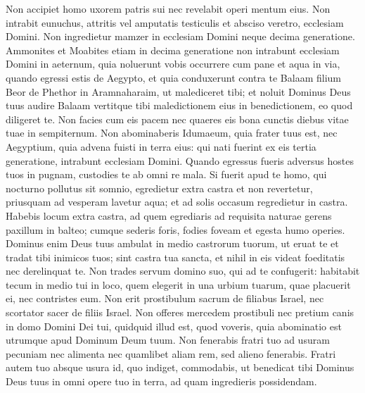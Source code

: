 \begin{biblechapter}
\begin{biblechapter}
\begin{biblechapter}
\begin{biblechapter}
\begin{biblechapter}
\begin{biblechapter}
\begin{biblechapter}
\begin{biblechapter}
\begin{biblechapter}
\begin{biblechapter}
\begin{biblechapter}
\begin{biblechapter}
\begin{biblechapter}
\begin{biblechapter}
\begin{biblechapter}
\begin{biblechapter}
\begin{biblechapter}
\begin{biblechapter}
\begin{biblechapter}
\begin{biblechapter}
\begin{biblechapter}
\begin{biblechapter}
\begin{biblechapter}
\verse Non accipiet homo uxorem patris sui nec revelabit operi mentum eius.
 \verse Non intrabit eunuchus, attritis vel amputatis testiculis et absciso veretro, ecclesiam Domini. 
\verse Non ingredietur mamzer in ecclesiam Domini neque decima generatione. 
\verse Ammonites et Moabites etiam in decima generatione non intrabunt ecclesiam Domini in aeternum, 
\verse quia noluerunt vobis occurrere cum pane et aqua in via, quando egressi estis de Aegypto, et quia conduxerunt contra te Balaam filium Beor de Phethor in Aramnaharaim, ut malediceret tibi; 
\verse et noluit Dominus Deus tuus audire Balaam vertitque tibi maledictionem eius in benedictionem, eo quod diligeret te. 
\verse Non facies cum eis pacem nec quaeres eis bona cunctis diebus vitae tuae in sempiternum.
 \verse Non abominaberis Idumaeum, quia frater tuus est, nec Aegyptium, quia advena fuisti in terra eius: 
\verse qui nati fuerint ex eis tertia generatione, intrabunt ecclesiam Domini.
 \verse Quando egressus fueris adversus hostes tuos in pugnam, custodies te ab omni re mala. 
\verse Si fuerit apud te homo, qui nocturno pollutus sit somnio, egredietur extra castra et non revertetur, 
\verse priusquam ad vesperam lavetur aqua; et ad solis occasum regredietur in castra. 
\verse Habebis locum extra castra, ad quem egrediaris ad requisita naturae 
\verse gerens paxillum in balteo; cumque sederis foris, fodies foveam et egesta humo operies. 
\verse Dominus enim Deus tuus ambulat in medio castrorum tuorum, ut eruat te et tradat tibi inimicos tuos; sint castra tua sancta, et nihil in eis videat foeditatis nec derelinquat te.
 \verse Non trades servum domino suo, qui ad te confugerit: 
\verse habitabit tecum in medio tui in loco, quem elegerit in una urbium tuarum, quae placuerit ei, nec contristes eum.
 \verse Non erit prostibulum sacrum de filiabus Israel, nec scortator sacer de filiis Israel. 
\verse Non offeres mercedem prostibuli nec pretium canis in domo Domini Dei tui, quidquid illud est, quod voveris, quia abominatio est utrumque apud Dominum Deum tuum.
 \verse Non fenerabis fratri tuo ad usuram pecuniam nec alimenta nec quamlibet aliam rem, 
\verse sed alieno fenerabis. Fratri autem tuo absque usura id, quo indiget, commodabis, ut benedicat tibi Dominus Deus tuus in omni opere tuo in terra, ad quam ingredieris possidendam.

\end{biblechapter}
\end{biblechapter}
\end{biblechapter}
\end{biblechapter}
\end{biblechapter}
\end{biblechapter}
\end{biblechapter}
\end{biblechapter}
\end{biblechapter}
\end{biblechapter}
\end{biblechapter}
\end{biblechapter}
\end{biblechapter}
\end{biblechapter}
\end{biblechapter}
\end{biblechapter}
\end{biblechapter}
\end{biblechapter}
\end{biblechapter}
\end{biblechapter}
\end{biblechapter}
\end{biblechapter}
\end{biblechapter}

